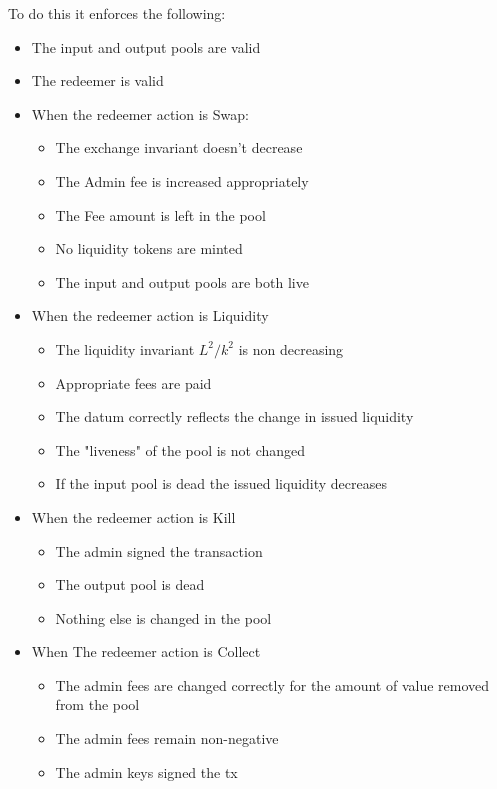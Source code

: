 \documentclass{article}
\begin{document}
To do this it enforces the following:
\begin{itemize}
	\item The input and output pools are valid
	\item The redeemer is valid
	\item When the redeemer action is Swap:
		\begin{itemize}
			\item The exchange invariant doesn't decrease
			\item The Admin fee is increased appropriately
			\item The Fee amount is left in the pool
			\item No liquidity tokens are minted
			\item The input and output pools are both live
		\end{itemize}
	\item When the redeemer action is Liquidity
		\begin{itemize}
			\item The liquidity invariant $L^2/k^2$ is non decreasing
			\item Appropriate fees are paid
			\item The datum correctly reflects the change in issued liquidity
			\item The "liveness" of the pool is not changed
			\item If the input pool is dead the issued liquidity decreases
		\end{itemize}
	\item When the redeemer action is Kill
		\begin{itemize}
			\item The admin signed the transaction
      \item The output pool is dead
			\item Nothing else is changed in the pool
		\end{itemize}
	\item When The redeemer action is Collect
		\begin{itemize}
			\item The admin fees are changed correctly
				for the amount of value removed from the pool
			\item The admin fees remain non-negative
			\item The admin keys signed the tx
		\end{itemize}
\end{itemize}
\end{document}
